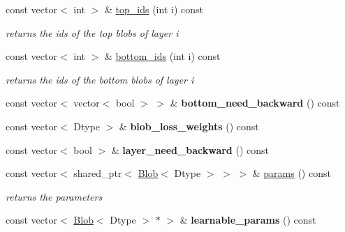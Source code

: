 \begin{DoxyCompactItemize}
const vector$<$ int $>$ \& \mbox{\hyperlink{classcaffe_1_1_net_a8e42b5eba7886385d2d4b6f457314968}{top\+\_\+ids}} (int i) const
\begin{DoxyCompactList}\small\item\em returns the ids of the top blobs of layer i \end{DoxyCompactList}\item 
\mbox{\label{classcaffe_1_1_net_a7ccd2bf8a1684171b7d7603cf20c0251}} 
const vector$<$ int $>$ \& \mbox{\hyperlink{classcaffe_1_1_net_a7ccd2bf8a1684171b7d7603cf20c0251}{bottom\+\_\+ids}} (int i) const
\begin{DoxyCompactList}\small\item\em returns the ids of the bottom blobs of layer i \end{DoxyCompactList}\item 
\mbox{\label{classcaffe_1_1_net_abe9a3629ee7436c85ea141e841d859f8}} 
const vector$<$ vector$<$ bool $>$ $>$ \& {\bfseries bottom\+\_\+need\+\_\+backward} () const
\item 
\mbox{\label{classcaffe_1_1_net_a4c18612b7683788a4b7f40265a7a38e0}} 
const vector$<$ Dtype $>$ \& {\bfseries blob\+\_\+loss\+\_\+weights} () const
\item 
\mbox{\label{classcaffe_1_1_net_a878f773481d3014b972cab5f65642e58}} 
const vector$<$ bool $>$ \& {\bfseries layer\+\_\+need\+\_\+backward} () const
\item 
\mbox{\label{classcaffe_1_1_net_a4df30bbef7db3a6069d4ab3d9238cb40}} 
const vector$<$ shared\+\_\+ptr$<$ \mbox{\hyperlink{classcaffe_1_1_blob}{Blob}}$<$ Dtype $>$ $>$ $>$ \& \mbox{\hyperlink{classcaffe_1_1_net_a4df30bbef7db3a6069d4ab3d9238cb40}{params}} () const
\begin{DoxyCompactList}\small\item\em returns the parameters \end{DoxyCompactList}\item 
\mbox{\label{classcaffe_1_1_net_ababc9943a5f0f006cded03aeb727a314}} 
const vector$<$ \mbox{\hyperlink{classcaffe_1_1_blob}{Blob}}$<$ Dtype $>$ $\ast$ $>$ \& {\bfseries learnable\+\_\+params} () const
\item 

\end{DoxyCompactItemize}
